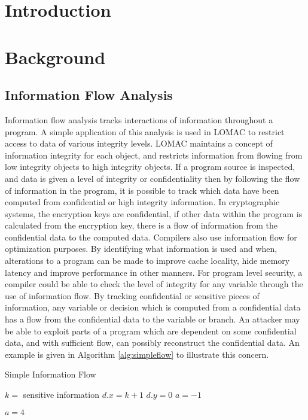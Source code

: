 \documentclass[11pt,a4paper]{article}
\title{}
\author{Adam Mohammed}
\date{\vspace{-1ex}January 29, 2018}
\begin{document}
\section{Introduction}
%
\section{Background}
\subsection{Information Flow Analysis}
Information flow analysis tracks interactions of information throughout a
program. A simple application of this analysis is used in LOMAC to restrict
access to data of various integrity levels. LOMAC maintains a concept of
information integrity for each object, and restricts information from flowing
from low integrity objects to high integrity objects. If a program source is
inspected, and data is given a level of integrity or confidentiality then by
following the flow of information in the program, it is possible to track which
data have been computed from confidential or high integrity information. In
cryptographic systems, the encryption keys are confidential, if other data
within the program is calculated from the encryption key, there is a flow of
information from the confidential data to the computed data. Compilers also use
information flow for optimization purposes. By identifying what information is
used and when, alterations to a program can be made to improve cache locality,
hide memory latency and improve performance in other manners. For program level
security, a compiler could be able to check the level of integrity for any
variable through the use of information flow. By tracking confidential or
sensitive pieces of information, any variable or decision which is computed from
a confidential data has a flow from the confidential data to the variable or
branch. An attacker may be able to exploit parts of a program which are
dependent on some confidential data, and with sufficient flow, can possibly
reconstruct the confidential data. An example is given in Algorithm
\ref{alg:simpleflow} to illustrate this concern.

\begin{algorithm}
  \caption{Simple Information Flow}
  \label{alg:simpleflow}
\begin{algorithmic}
  \State $k =$ sensitive information
  \State $d.x =  k + 1$
  \State $d.y = 0$
  \State $a = -1$

    \State $a = 4$ 
  \EndIf

\end{algorithmic}
\end{algorithm}
\end{document}
